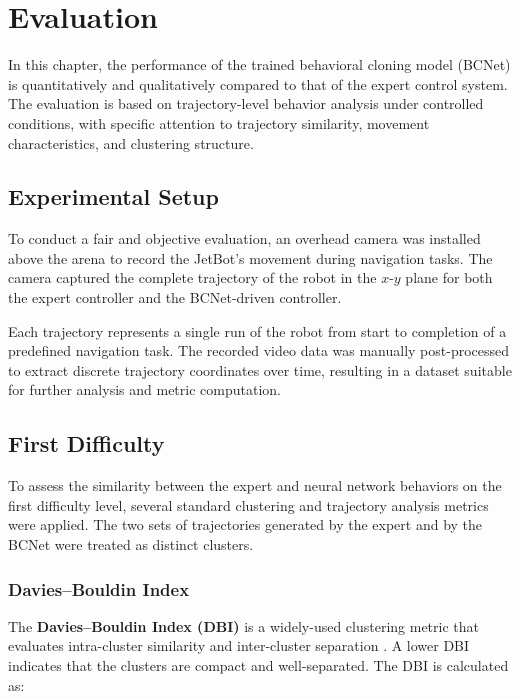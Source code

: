 \chapter{Evaluation}
\label{cha:evaluation}

In this chapter, the performance of the trained behavioral cloning model (BCNet) is quantitatively and qualitatively compared to that of the expert control system. The evaluation is based on trajectory-level behavior analysis under controlled conditions, with specific attention to trajectory similarity, movement characteristics, and clustering structure.

\section{Experimental Setup}

To conduct a fair and objective evaluation, an overhead camera was installed above the arena to record the JetBot's movement during navigation tasks. The camera captured the complete trajectory of the robot in the $x$-$y$ plane for both the expert controller and the BCNet-driven controller.

Each trajectory represents a single run of the robot from start to completion of a predefined navigation task. The recorded video data was manually post-processed to extract discrete trajectory coordinates over time, resulting in a dataset suitable for further analysis and metric computation.

\section{First Difficulty}

To assess the similarity between the expert and neural network behaviors on the first difficulty level, several standard clustering and trajectory analysis metrics were applied. The two sets of trajectories generated by the expert and by the BCNet were treated as distinct clusters.

\subsection{Davies–Bouldin Index}

The \textbf{Davies–Bouldin Index (DBI)} is a widely-used clustering metric that evaluates intra-cluster similarity and inter-cluster separation \autocite{4766909}. A lower DBI indicates that the clusters are compact and well-separated. The DBI is calculated as:


